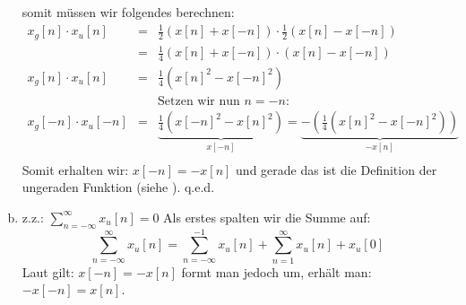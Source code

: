 \begin{uebsp}
\begin{Answer}
\begin{enumerate}[a)]
                    somit müssen wir folgendes berechnen:
                \begin{eqnarray*}
                    x_g[n]\cdot x_u[n]&=&\frac{1}{2}(x[n]+x[-n])\cdot\frac{1}{2}(x[n]-x[-n])\\
                    &=&\frac{1}{4}(x[n]+x[-n])\cdot(x[n]-x[-n])\\
                    x_g[n]\cdot x_u[n]&=&\frac{1}{4}(x[n]^2-x[-n]^2)\\
                                      &&\text{Setzen wir nun $n=-n$:}\\
                    x_g[-n]\cdot x_u[-n]&=&\underbrace{\frac{1}{4}(x[-n]^2-x[n]^2)}_{x[-n]}=\underbrace{-\left(\frac{1}{4}(x[n]^2-x[-n]^2)\right)}_{-x[n]}\\
                \end{eqnarray*}
                Somit erhalten wir: $x[-n]=-x[n]$ und gerade das ist die Definition der ungeraden Funktion (siehe ). q.e.d.
        \item z.z.: $\sum_{n=-\infty}^\infty x_u[n]=0$\label{itm:sumu}
            Als erstes spalten wir die Summe auf:
            \[\sum_{n=-\infty}^\infty x_u[n]=\sum_{n=-\infty}^{-1} x_u[n]+\sum_{n=1}^\infty x_u[n]+x_u[0]\]
            Laut  gilt: $x[-n]=-x[n]$ formt man jedoch um, erhält man: $-x[-n]=x[n]$.


\end{enumerate}
\end{Answer}
\end{uebsp}
